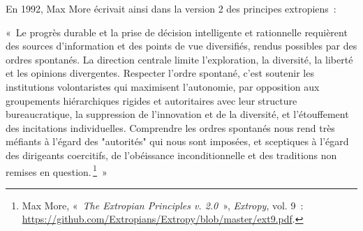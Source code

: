 \documentclass[a4paper,notitlepage]{article}
\renewenvironment{quote}{\small\list{}{\topsep=0.5\baselineskip}\item\relax}{\endlist} %
\newcommand{\eng}[1]{{\NoAutoSpaceBeforeFDP\emph{#1}}}  %
\newcommand{\sfootnote}{\,\footnote}
\begin{document}
En 1992, Max More écrivait ainsi dans la version 2 des principes extropiens~:

\begin{quote}
«~Le progrès durable et la prise de décision intelligente et rationnelle requièrent des sources d'information et des points de vue diversifiés, rendus possibles par des ordres spontanés. La direction centrale limite l'exploration, la diversité, la liberté et les opinions divergentes. Respecter l'ordre spontané, c'est soutenir les institutions volontaristes qui maximisent l'autonomie, par opposition aux groupements hiérarchiques rigides et autoritaires avec leur structure bureaucratique, la suppression de l'innovation et de la diversité, et l'étouffement des incitations individuelles. Comprendre les ordres spontanés nous rend très méfiants à l'égard des "autorités" qui nous sont imposées, et sceptiques à l'égard des dirigeants coercitifs, de l'obéissance inconditionnelle et des traditions non remises en question.\sfootnote{Max More, «~\eng{The Extropian Principles v. 2.0}~», \eng{Extropy}, vol. 9~: \url{https://github.com/Extropians/Extropy/blob/master/ext9.pdf}.}~»
\end{quote}

%
\end{document}
